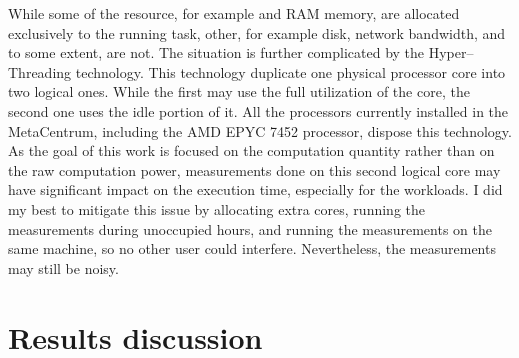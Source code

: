 While some of the resource, for example \gpu and RAM memory, are allocated exclusively to the running task, other, for example disk, network bandwidth, and \cpu to some extent, are not. The \cpu situation is further complicated by the Hyper--Threading technology. This technology duplicate one physical processor core into two logical ones. While the first may use the full utilization of the core, the second one uses the idle portion of it. All the processors currently installed in the MetaCentrum, including the AMD EPYC 7452 processor, dispose this technology. As the goal of this work is focused on the computation quantity rather than on the raw computation power, measurements done on this second logical core may have significant impact on the execution time, especially for the \cpu workloads. I did my best to mitigate this issue by allocating extra cores, running the measurements during unoccupied hours, and running the measurements on the same machine, so no other user could interfere. Nevertheless, the measurements may still be noisy.




\section{Results discussion}

